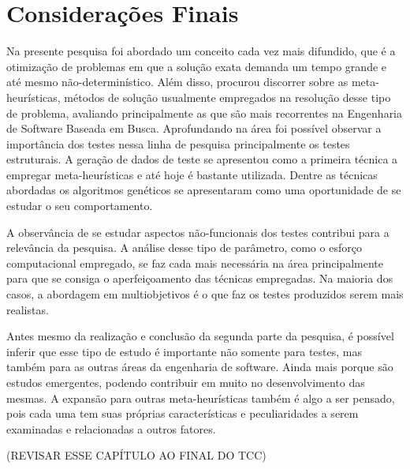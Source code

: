 \chapter[Considerações Finais]{Considerações Finais}
\label{conclusoes}

Na presente pesquisa foi abordado um conceito cada vez mais difundido, que é a otimização de problemas em que a solução exata demanda um tempo grande e até mesmo não-determinístico. Além disso, procurou discorrer sobre as meta-heurísticas, métodos de solução usualmente empregados na resolução desse tipo de problema, avaliando principalmente as que são mais recorrentes na Engenharia de Software Baseada em Busca. Aprofundando na área foi possível observar a importância dos testes nessa linha de pesquisa principalmente os testes estruturais. A geração de dados de teste se apresentou como a primeira técnica a empregar meta-heurísticas e até hoje é bastante utilizada. Dentre as técnicas abordadas os algoritmos genéticos se apresentaram como uma oportunidade de se estudar o seu comportamento.

A observância de se estudar aspectos não-funcionais dos testes contribui para a relevância da pesquisa. A análise desse tipo de parâmetro, como o esforço computacional empregado, se faz cada mais necessária na área principalmente para que se consiga o aperfeiçoamento das técnicas empregadas. Na maioria dos casos, a abordagem em multiobjetivos é o que faz os testes produzidos serem mais realistas. 

Antes mesmo da realização e conclusão da segunda parte da pesquisa, é possível inferir que esse tipo de estudo é importante não somente para testes, mas também para as outras áreas da engenharia de software. Ainda mais porque são estudos emergentes, podendo contribuir em muito no desenvolvimento das mesmas. A expansão para outras meta-heurísticas também é algo a ser pensado, pois cada uma tem suas próprias características e peculiaridades a serem examinadas e relacionadas a outros fatores.

(REVISAR ESSE CAPÍTULO AO FINAL DO TCC)
